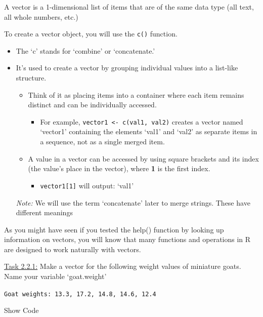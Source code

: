 \documentclass[
]{article}
\providecommand{\tightlist}{%
  \setlength{\itemsep}{0pt}\setlength{\parskip}{0pt}}
\begin{document}
A vector is a 1-dimensional list of items that are of the same data type
(all text, all whole numbers, etc.)

To create a vector object, you will use the \texttt{c()} function.

\begin{itemize}
\item
  The `c' stands for `combine' or `concatenate.'
\item
  It's used to create a vector by grouping individual values into a
  list-like structure.

  \begin{itemize}
  \item
    Think of it as placing items into a container where each item
    remains distinct and can be individually accessed.

    \begin{itemize}
    \tightlist
    \item
      For example, \texttt{vector1\ \textless{}-\ c(val1,\ val2)}
      creates a vector named `vector1' containing the elements `val1'
      and `val2' as separate items in a sequence, not as a single merged
      item.
    \end{itemize}
  \item
    A value in a vector can be accessed by using square brackets and its
    index (the value's place in the vector), where \textbf{1} is the
    first index.

    \begin{itemize}
    \tightlist
    \item
      \texttt{vector1{[}1{]}} will output: `val1'
    \end{itemize}
  \end{itemize}

  \emph{Note:} We will use the term `concatenate' later to merge
  strings. These have different meanings
\end{itemize}

As you might have seen if you tested the help() function by looking up
information on vectors, you will know that many functions and operations
in R are designed to work naturally with vectors.

\ul{Task 2.2.1:} Make a vector for the following weight values of
miniature goats. Name your variable `goat.weight'

\texttt{Goat\ weights:\ 13.3,\ 17.2,\ 14.8,\ 14.6,\ 12.4}

Show Code
\end{document}
